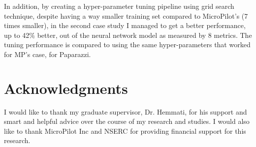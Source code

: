In addition, by creating a hyper-parameter tuning pipeline using grid search technique, despite having a way smaller training set compared to MicroPilot's (7 times smaller), in the second case study I managed to get a better performance, up to 42\% better, out of the neural network model as measured by 8 metrics.
The tuning performance is compared to using the same hyper-parameters that worked for MP's case, for Paparazzi.%




\chapter{Acknowledgments}
I would like to thank my graduate supervisor, Dr. Hemmati, for his support and smart and helpful advice over the course of my research and studies.
I would also like to thank MicroPilot Inc and NSERC for providing financial support for this research.




\dedication{To the ones who made this a smoother journey.} 


\tableofcontents


\listoftables


\listoffigures


